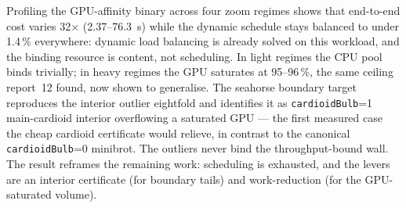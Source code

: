 \documentclass[
	english,
	letterpaper, oneside
]{article}
\begin{document}
Profiling the GPU-affinity binary across four zoom regimes shows that end-to-end
cost varies 32$\times$ (2.37--76.3~s) while the dynamic schedule stays balanced to
under 1.4\,\% everywhere: dynamic load balancing is already solved on this
workload, and the binding resource is content, not scheduling. In light regimes
the CPU pool binds trivially; in heavy regimes the GPU saturates at 95--96\,\%,
the same ceiling report~12 found, now shown to generalise. The seahorse boundary
target reproduces the interior outlier eightfold and identifies it as
\texttt{cardioidBulb}=1 main-cardioid interior overflowing a saturated GPU ---
the first measured case the cheap cardioid certificate would relieve, in contrast
to the canonical \texttt{cardioidBulb}=0 minibrot. The outliers never bind the
throughput-bound wall. The result reframes the remaining work: scheduling is
exhausted, and the levers are an interior certificate (for boundary tails) and
work-reduction (for the GPU-saturated volume).
\end{document}
